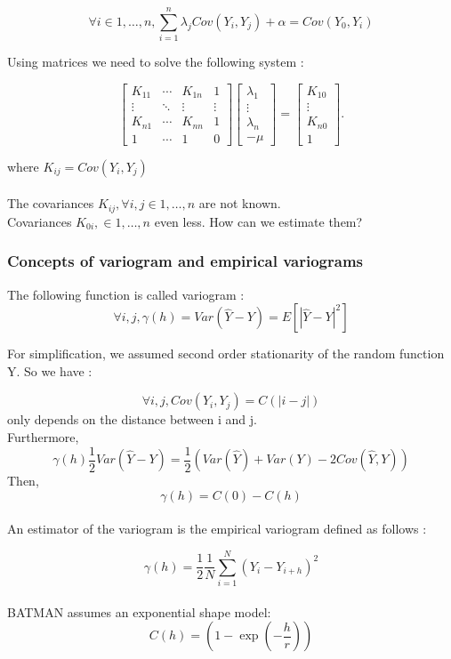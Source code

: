 \documentclass[hidelinks,12pt]{article}
\begin{document}
$$\forall i \in {1,\ldots, n}, \sum_{i=1}^{n}\lambda_j Cov(Y_i,Y_j)+ \alpha = Cov(Y_0,Y_i)$$

Using matrices we need to solve the following system :

$$
\begin{bmatrix}
K_{11}& \cdots  & K_{1n} & 1\\ \vdots & \ddots & \vdots & \vdots \\ K_{n1} & \cdots  & K_{nn} & 1 \\ 1 & \cdots & 1 & 0 
\end{bmatrix} 
\begin{bmatrix}
\lambda_1 \\ \vdots \\ \lambda_n \\ - \mu 
\end{bmatrix} = 
\begin{bmatrix} K_{10} \\ \vdots \\ K_{n0} \\ 1
\end{bmatrix}.$$

where $K_{ij}=Cov(Y_i,Y_j)$
\\\\
The covariances $K_{ij}, \forall i,j\in {1,\ldots,n}$ are not known.
\\
Covariances $K_{0i}, \in {1,\ldots,n}$ even less. How can we estimate them?

\subsubsection{Concepts of variogram and empirical variograms}

The following function is called variogram : $$\forall i,j, \gamma(h)=Var(\hat{Y}-Y)=E[|\hat{Y}-Y|^2]$$

For simplification, we assumed second order stationarity of the random function Y. So we have :

$$\forall i,j, Cov(Y_i,Y_{j})=C(|i-j|)$$ only depends on the distance between i and j.
\\
Furthermore, $$\gamma(h)\frac{1}{2}Var(\hat{Y}-Y)=\frac{1}{2}(Var(\hat{Y})+Var(Y)-2Cov(\hat{Y},Y))$$
Then,$$\gamma(h)=C(0)-C(h)$$
\\
An estimator of the variogram is the empirical variogram defined as follows :

$$\gamma(h)=\frac{1}{2} \frac{1}{N} \sum_{i=1}^{N} (Y_i - Y_{i+h})^2$$
\\
BATMAN assumes an exponential shape model: 
$$C(h)=\left(1- \exp{\left(-\frac{h}{r}\right)}\right)$$
\end{document}
